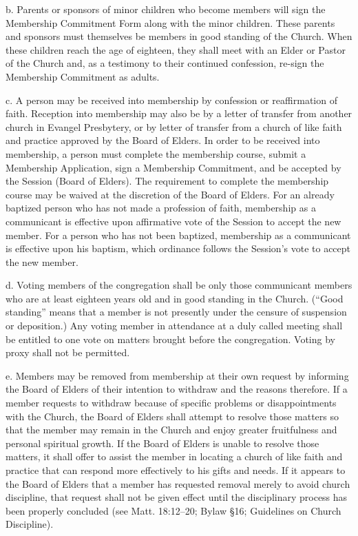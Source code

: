 \documentclass[
]{book}
\begin{document}
b. Parents or sponsors of minor children who become members will sign the Membership Commitment Form along with the minor children. These parents and sponsors must themselves be members in good standing of the Church. When these children reach the age of eighteen, they shall meet with an Elder or Pastor of the Church and, as a testimony to their continued confession, re-sign the Membership Commitment as adults.

c. A person may be received into membership by confession or reaffirmation of faith. Reception into membership may also be by a letter of transfer from another church in Evangel Presbytery, or by letter of transfer from a church of like faith and practice approved by the Board of Elders. In order to be received into membership, a person must complete the membership course, submit a Membership Application, sign a Membership Commitment, and be accepted by the Session (Board of Elders). The requirement to complete the membership course may be waived at the discretion of the Board of Elders. For an already baptized person who has not made a profession of faith, membership as a communicant is effective upon affirmative vote of the Session to accept the new member. For a person who has not been baptized, membership as a communicant is effective upon his baptism, which ordinance follows the Session's vote to accept the new member.

d. Voting members of the congregation shall be only those communicant members who are at least eighteen years old and in good standing in the Church. (``Good standing'' means that a member is not presently under the censure of suspension or deposition.) Any voting member in attendance at a duly called meeting shall be entitled to one vote on matters brought before the congregation. Voting by proxy shall not be permitted.

e. Members may be removed from membership at their own request by informing the Board of Elders of their intention to withdraw and the reasons therefore. If a member requests to withdraw because of specific problems or disappointments with the Church, the Board of Elders shall attempt to resolve those matters so that the member may remain in the Church and enjoy greater fruitfulness and personal spiritual growth. If the Board of Elders is unable to resolve those matters, it shall offer to assist the member in locating a church of like faith and practice that can respond more effectively to his gifts and needs. If it appears to the Board of Elders that a member has requested removal merely to avoid church discipline, that request shall not be given effect until the disciplinary process has been properly concluded (see Matt. 18:12--20; Bylaw §16; Guidelines on Church Discipline).
\end{document}
